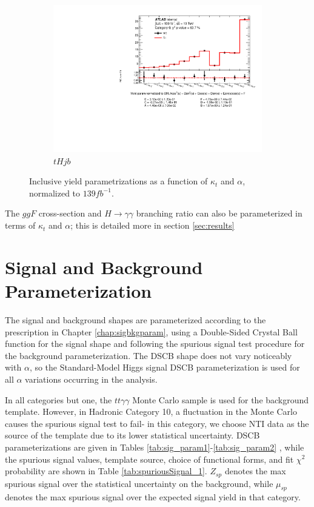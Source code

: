 \begin{figure}[htp]
\begin{subfigure}[b]{0.3\textwidth}
         \includegraphics[width=\textwidth]{figures/tthcp_results/yield_tHjb_0.pdf}
         \caption{$tHjb$}
         \label{fig:tHjbYield}
     \end{subfigure}
     \hfill
  \label{fig:YieldParams}
  \caption{Inclusive yield parametrizations as a function of $\kappa_{t}$ and $\alpha$, normalized to $139 fb^{-1}$.}  
\end{figure}


The $ggF$ cross-section and $H \rightarrow \gamma \gamma$ branching ratio can also be parameterized in terms of $\kappa_{t}$ and $\alpha$; this is detailed more in section \ref{sec:results}

\section{Signal and Background Parameterization}

The signal and background shapes are parameterized according to the prescription in Chapter \ref{chap:sigbkgparam}, using a Double-Sided Crystal Ball function for the signal shape and following the spurious signal test procedure for the background parameterization. The DSCB shape does not vary noticeably with $\alpha$, so the Standard-Model Higgs signal DSCB parameterization is used for all $\alpha$ variations occurring in the analysis.

In all categories but one, the $tt\gamma\gamma$ Monte Carlo sample is used for the background template. However, in Hadronic Category 10, a fluctuation in the Monte Carlo causes the spurious signal test to fail- in this category, we choose NTI data as the source of the template due to its lower statistical uncertainty. DSCB parameterizations are given in Tables \ref{tab:sig_param1}-\ref{tab:sig_param2} , while the spurious signal values, template source, choice of functional forms, and fit $\chi^{2}$ probability are shown in Table \ref{tab:spuriousSignal_1}. $Z_{sp}$ denotes the max spurious signal over the statistical uncertainty on the background, while $\mu_{sp}$ denotes the max spurious signal over the expected signal yield in that category.


